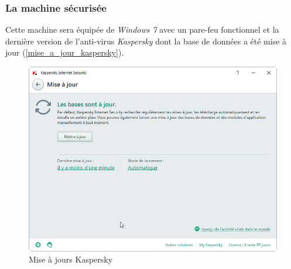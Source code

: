     \subsubsection{La machine sécurisée} 
    Cette machine sera équipée de \emph{Windows 7} avec un pare-feu fonctionnel et la dernière version de l'anti-virus 
    \emph{Kaspersky} dont la base de données a été mise à jour (\autoref{mise_a_jour_kaspersky}). %

    \begin{figure}[!h]
        \centering
        \includegraphics[width=\linewidth]{images/mise_a_jour_kaspersky.png}
        \caption{Mise à jours Kaspersky}
        \label{mise_a_jour_kaspersky}
    \end{figure}

